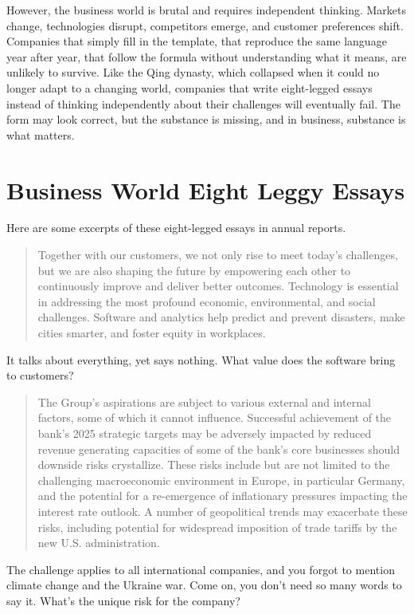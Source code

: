 However, the business world is brutal and requires independent thinking. Markets change, technologies disrupt, competitors emerge, and customer preferences shift. Companies that simply fill in the template, that reproduce the same language year after year, that follow the formula without understanding what it means, are unlikely to survive. Like the Qing dynasty, which collapsed when it could no longer adapt to a changing world, companies that write eight-legged essays instead of thinking independently about their challenges will eventually fail. The form may look correct, but the substance is missing, and in business, substance is what matters.

\section{Business World Eight Leggy Essays}

Here are some excerpts of these eight-legged essays in annual reports.

\begin{quote}
    Together with our customers, we not only rise to meet today's challenges, but we are also shaping the future by empowering each other to continuously improve and deliver better outcomes. Technology is essential in addressing the most profound economic, environmental, and social challenges. Software and analytics help predict and prevent disasters, make cities smarter, and foster equity in workplaces.
\end{quote}
    
It talks about everything, yet says nothing. What value does the software bring to customers?

\begin{quote}
    The Group's aspirations are subject to various external and internal factors, some of which it cannot influence. Successful
achievement of the bank's 2025 strategic targets may be adversely impacted by reduced revenue generating capacities
of some of the bank's core businesses should downside risks crystallize. These risks include but are not limited to the
challenging macroeconomic environment in Europe, in particular Germany, and the potential for a re-emergence of
inflationary pressures impacting the interest rate outlook. A number of geopolitical trends may exacerbate these risks,
including potential for widespread imposition of trade tariffs by the new U.S. administration.
\end{quote}

The challenge applies to all international companies, and you forgot to mention climate change and the Ukraine war.
Come on, you don't need so many words to say it. What's the unique risk for the company?

